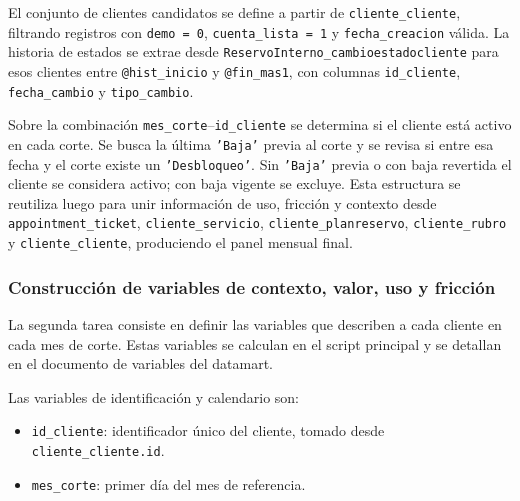 El conjunto de clientes candidatos se define a partir de \texttt{cliente\_\hspace{0pt}cliente}, filtrando registros con \texttt{demo = 0}, \texttt{cuenta\_\hspace{0pt}lista = 1} y \texttt{fecha\_\hspace{0pt}creacion} válida. La historia de estados se extrae desde \texttt{ReservoInterno\_\hspace{0pt}cambioestadocliente} para esos clientes entre \texttt{@hist\_\hspace{0pt}inicio} y \texttt{@fin\_\hspace{0pt}mas1}, con columnas \texttt{id\_\hspace{0pt}cliente}, \texttt{fecha\_\hspace{0pt}cambio} y \texttt{tipo\_\hspace{0pt}cambio}.

Sobre la combinación \texttt{mes\_\hspace{0pt}corte}–\texttt{id\_\hspace{0pt}cliente} se determina si el cliente está activo en cada corte. Se busca la última \texttt{'Baja'} previa al corte y se revisa si entre esa fecha y el corte existe un \texttt{'Desbloqueo'}. Sin \texttt{'Baja'} previa o con baja revertida el cliente se considera activo; con baja vigente se excluye. Esta estructura se reutiliza luego para unir información de uso, fricción y contexto desde \texttt{appointment\_\hspace{0pt}ticket}, \texttt{cliente\_\hspace{0pt}servicio}, \texttt{cliente\_\hspace{0pt}planreservo}, \texttt{cliente\_\hspace{0pt}rubro} y \texttt{cliente\_\hspace{0pt}cliente}, produciendo el panel mensual final.

\subsubsection{Construcción de variables de contexto, valor, uso y fricción}

La segunda tarea consiste en definir las variables que describen a cada cliente en cada mes de corte. Estas variables se calculan en el script principal y se detallan en el documento de variables del datamart. 

Las variables de identificación y calendario son:

\begin{itemize}
    \item \texttt{id\_\hspace{0pt}cliente}: identificador único del cliente, tomado desde \texttt{cliente\_\hspace{0pt}cliente.id}.
    \item \texttt{mes\_\hspace{0pt}corte}: primer día del mes de referencia.
\end{itemize}

